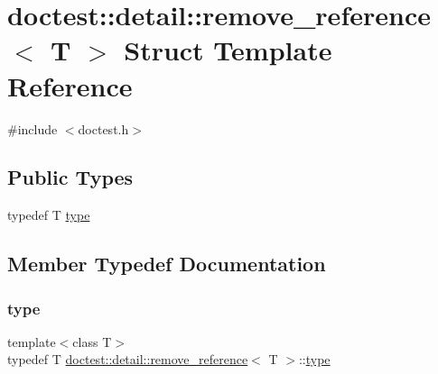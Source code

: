 \hypertarget{structdoctest_1_1detail_1_1remove__reference}{}\section{doctest\+:\+:detail\+:\+:remove\+\_\+reference$<$ T $>$ Struct Template Reference}
\label{structdoctest_1_1detail_1_1remove__reference}


{\ttfamily \#include $<$doctest.\+h$>$}

\subsection*{Public Types}
\begin{DoxyCompactItemize}
\item 
typedef T \hyperlink{structdoctest_1_1detail_1_1remove__reference_ab3cba0e8bc4c71b7f4ecdf85476ec4cc}{type}
\end{DoxyCompactItemize}


\subsection{Member Typedef Documentation}
\mbox{\label{structdoctest_1_1detail_1_1remove__reference_ab3cba0e8bc4c71b7f4ecdf85476ec4cc}} 
\subsubsection{\texorpdfstring{type}{type}}
{\footnotesize\ttfamily template$<$class T$>$ \\
typedef T \hyperlink{structdoctest_1_1detail_1_1remove__reference}{doctest\+::detail\+::remove\+\_\+reference}$<$ T $>$\+::\hyperlink{structdoctest_1_1detail_1_1remove__reference_ab3cba0e8bc4c71b7f4ecdf85476ec4cc}{type}}

